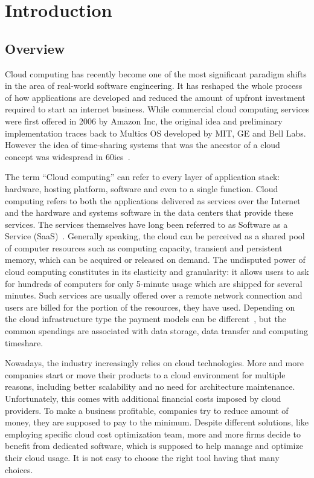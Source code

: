 \documentclass[licencjacka,en]{thesisclass}
\begin{document}
    \chapter{Introduction}


    \section{Overview}

    Cloud computing has recently become one of the most significant paradigm shifts
    in the area of real-world software engineering.
    It has reshaped the whole process of how applications are developed
    and reduced the amount of upfront
    investment required to start an internet business.
    While commercial cloud computing services were first offered
    in 2006 by Amazon Inc, the original idea and preliminary
    implementation traces back to Multics OS developed by MIT,
    GE and Bell Labs.
    However the idea of time-sharing systems that was the ancestor of a cloud
    concept was widespread in 60ies~\cite{Markus}.

    The term “Cloud computing” can refer to every layer of application stack:
    hardware, hosting platform, software and even to a single function.
    Cloud computing refers to both the applications delivered as services over the Internet
    and the hardware and systems software in the data centers that provide these services.
    The services themselves have long been referred to
    as Software as a Service (SaaS)~\cite{Armbrust}.
    Generally speaking, the cloud can be perceived as a shared pool
    of computer resources such as computing capacity,
    transient and persistent memory, which can be acquired or released on demand.
    The undisputed power of cloud computing constitutes
    in its elasticity and granularity: it allows users
    to ask for hundreds of computers for only 5-minute usage which
    are shipped for several minutes.
    Such services are usually offered over a remote network connection and users are billed
    for the portion of the resources, they have used.
    Depending on the cloud infrastructure type the payment models
    can be different~\cite{Laatikainen},
    but the common spendings are associated with data storage,
    data transfer and computing timeshare.

    Nowadays, the industry increasingly relies on cloud technologies.
    More and more companies start or move their products to a cloud environment
    for multiple reasons, including better scalability
    and no need for architecture maintenance.
    Unfortunately, this comes with additional financial costs imposed by cloud providers.
    To make a business profitable, companies try
    to reduce amount of money, they are supposed to pay to the minimum.
    Despite different solutions, like employing specific
    cloud cost optimization team, more and more firms decide
    to benefit from dedicated software, which is supposed to help
    manage and optimize their cloud usage.
    It is not easy to choose the right tool having that many choices.
\end{document}
